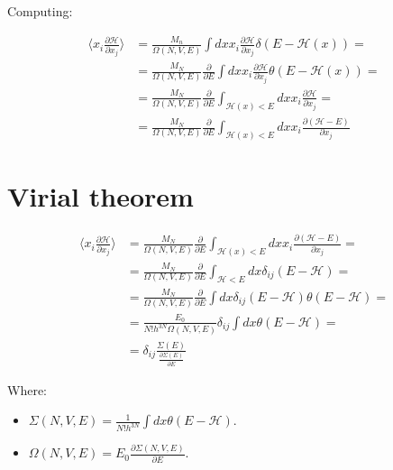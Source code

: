 	Computing:

	\begin{align*}
		\biggl\langle x_i\frac{\partial\mathcal{H}}{\partial x_j}\biggr\rangle &= \frac{M_n}{\Omega(N, V, E)}\int dxx_i\frac{\partial\mathcal{H}}{\partial x_j}\delta(E-\mathcal{H}(x))=\\
																																					 &=\frac{M_N}{\Omega(N, V, E)}\frac{\partial}{\partial E}\int dxx_i\frac{\partial\mathcal{H}}{\partial x_j}\theta(E-\mathcal{H}(x)) =\\
																																					 &=\frac{M_N}{\Omega(N, V, E)}\frac{\partial}{\partial E}\int_{\mathcal{H}(x)<E}dxx_i\frac{\partial\mathcal{H}}{\partial x_j} = \\
																																					 &=\frac{M_N}{\Omega(N, V, E)}\frac{\partial}{\partial E}\int_{\mathcal{H}(x)<E}dxx_i\frac{\partial(\mathcal{H}-E)}{\partial x_j}
	\end{align*}

\section{Virial theorem}

\begin{align*}
	\biggl\langle x_i\frac{\partial\mathcal{H}}{\partial x_j}\biggr\rangle &= \frac{M_N}{\Omega(N, V, E)}\frac{\partial}{\partial E}\int_{\mathcal{H}(x)< E}dxx_i\frac{\partial(\mathcal{H}-E)}{\partial x_j} = \\
																																				 &= \frac{M_N}{\Omega(N, V, E)}\frac{\partial}{\partial E}\int_{\mathcal{H}<E} dx\delta_{ij}(E-\mathcal{H}) = \\
																																				 &=\frac{M_N}{\Omega(N, V, E)}\frac{\partial}{\partial E}\int dx\delta_{ij}(E-\mathcal{H})\theta(E-\mathcal{H}) = \\
																																				 &=\frac{E_0}{N!h^{3N}\Omega(N, V, E)}\delta_{ij}\int dx\theta(E-\mathcal{H}) =\\
																																				 &= \delta_{ij}\frac{\Sigma(E)}{\frac{\partial\Sigma(E)}{\partial E}}
\end{align*}

Where:

\begin{multicols}{2}
	\begin{itemize}
		\item $\Sigma(N, V, E) = \frac{1}{N!h^{3N}}\int dx\theta(E-\mathcal{H})$.
		\item $\Omega(N, V, E) = E_0\frac{\partial\Sigma(N, V, E)}{\partial E}$.
	\end{itemize}
\end{multicols}

